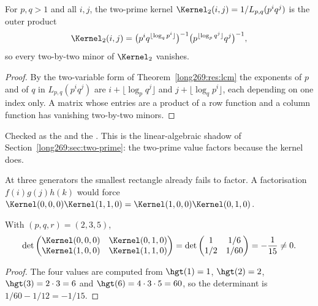 \begin{proposition}\label{long269:res:two-prime-rank}
For $p,q>1$ and all $i,j$, the two-prime kernel
$\Kernel_2(i,j)=1/L_{p,q}(p^iq^j)$ is the outer product
\[
 \Kernel_2(i,j)
 =\bigl(p^{i}q^{\lfloor\log_q p^{i}\rfloor}\bigr)^{-1}
  \bigl(p^{\lfloor\log_p q^{j}\rfloor}q^{j}\bigr)^{-1},
\]
so every two-by-two minor of $\Kernel_2$ vanishes.
\end{proposition}

\begin{proof}
By the two-variable form of Theorem~\ref{long269:res:lcm} the exponents of $p$ and of
$q$ in $L_{p,q}(p^iq^j)$ are $i+\lfloor\log_p q^{j}\rfloor$ and
$j+\lfloor\log_q p^{i}\rfloor$, each depending on one index only.  A matrix
whose entries are a product of a row function and a column function has
vanishing two-by-two minors.
\end{proof}

\noindent Checked as the
 and the
.  This is the linear-algebraic shadow of
Section~\ref{long269:sec:two-prime}: the two-prime value factors because the kernel
does.

At three generators the smallest rectangle already fails to factor.  A
factorisation $f(i)g(j)h(k)$ would force
$\Kernel(0,0,0)\Kernel(1,1,0)=\Kernel(1,0,0)\Kernel(0,1,0)$.

\begin{proposition}\label{long269:res:rank}
With $(p,q,r)=(2,3,5)$,
\[
 \det\begin{pmatrix}
 \Kernel(0,0,0)&\Kernel(0,1,0)\\
 \Kernel(1,0,0)&\Kernel(1,1,0)
 \end{pmatrix}
 =\det\begin{pmatrix}1&1/6\\1/2&1/60\end{pmatrix}
 =-\frac1{15}\ne0 .
\]
\end{proposition}

\begin{proof}
The four values are computed from $\hgt(1)=1$, $\hgt(2)=2$,
$\hgt(3)=2\cdot3=6$ and $\hgt(6)=4\cdot3\cdot5=60$, so the determinant is
$1/60-1/12=-1/15$.
\end{proof}

